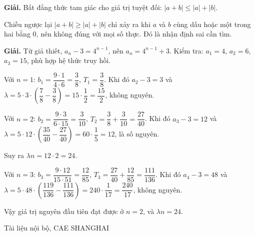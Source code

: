 \documentclass[11pt, a4paper]{article}
\begin{document}
\vspace{0.3cm}
\begin{dapan}[47 — Đáp án B]

\textbf{Giải.} Bất đẳng thức tam giác cho giá trị tuyệt đối: $\lvert a + b \rvert \le \lvert a \rvert + \lvert b \rvert$.

Chiều ngược lại $\lvert a + b \rvert \ge \lvert a \rvert + \lvert b \rvert$ chỉ xảy ra khi $a$ và $b$ cùng dấu hoặc một trong hai bằng $0$, nên không đúng với mọi số thực. Đó là nhận định sai cần tìm.


\end{dapan}
\vspace{0.3cm}
\begin{dapan}[48 — Đáp án A]

\textbf{Giải.} Từ giả thiết, $a_n - 3 = 4^{n-1}$, nên $a_n = 4^{n-1} + 3$. Kiểm tra: $a_1 = 4$, $a_2 = 6$, $a_3 = 15$, phù hợp hệ thức truy hồi.

Với $n = 1$: $b_1 = \dfrac{9 \cdot 1}{4 \cdot 6} = \dfrac{3}{8}$, $T_1 = \dfrac{3}{8}$. Khi đó $a_2 - 3 = 3$ và $\lambda = 5 \cdot 3 \cdot \left(\dfrac{7}{8} - \dfrac{3}{8}\right) = 15 \cdot \dfrac{1}{2} = \dfrac{15}{2}$, không nguyên.

Với $n = 2$: $b_2 = \dfrac{9 \cdot 3}{6 \cdot 15} = \dfrac{3}{10}$, $T_2 = \dfrac{3}{8} + \dfrac{3}{10} = \dfrac{27}{40}$. Khi đó $a_3 - 3 = 12$ và $\lambda = 5 \cdot 12 \cdot \left(\dfrac{35}{40} - \dfrac{27}{40}\right) = 60 \cdot \dfrac{1}{5} = 12$, là số nguyên.

Suy ra $\lambda n = 12 \cdot 2 = 24$.

Với $n = 3$: $b_3 = \dfrac{9 \cdot 12}{15 \cdot 51} = \dfrac{12}{85}$, $T_3 = \dfrac{27}{40} + \dfrac{12}{85} = \dfrac{111}{136}$. Khi đó $a_4 - 3 = 48$ và $\lambda = 5 \cdot 48 \cdot \left(\dfrac{119}{136} - \dfrac{111}{136}\right) = 240 \cdot \dfrac{1}{17} = \dfrac{240}{17}$, không nguyên.

Vậy giá trị nguyên đầu tiên đạt được ở $n = 2$, và $\lambda n = 24$.
\end{dapan}
\vspace{0.3cm}

\vspace{0.8cm}
\begin{center}
{\footnotesize\color{cae_blue} Tài liệu nội bộ, CAE SHANGHAI}
\end{center}
\end{document}

